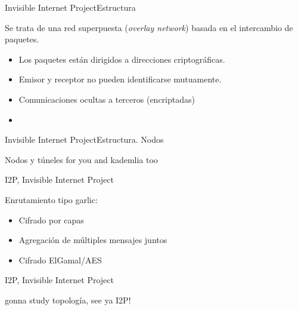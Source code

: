 \documentclass[spanish]{beamer}
\begin{document}
\begin{frame}{Invisible Internet Project}{Estructura}
	

Se trata de una red superpuesta (\textit{overlay network}) basada en el intercambio de paquetes.

\begin{itemize}
	\item Los paquetes están dirigidos a direcciones criptográficas.
	\item Emisor y receptor no pueden identificarse mutuamente.
	\item Comunicaciones ocultas a terceros (encriptadas)
	\item 
\end{itemize}
	
\end{frame}


\begin{frame}{Invisible Internet Project}{Estructura. Nodos}
	
	Nodos y túneles for you
	and kademlia too	
	
\end{frame}






\begin{frame}{I2P, Invisible Internet Project}
	
Enrutamiento tipo garlic:


\vspace{1.9em}


\begin{itemize}
	\item Cifrado por capas
	\item Agregación de múltiples mensajes juntos
	\item Cifrado ElGamal/AES
\end{itemize}
	
	
\end{frame}



\begin{frame}{I2P, Invisible Internet Project}

gonna study topología, see ya I2P!

\end{frame}
\end{document}
